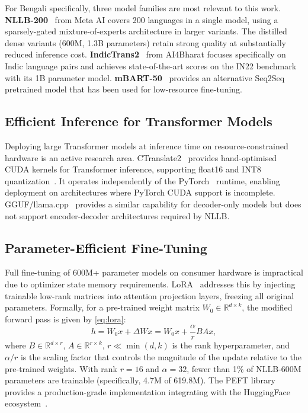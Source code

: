 \documentclass[conference]{IEEEtran}
\begin{document}
For Bengali specifically, three model families are most relevant to this work.
\textbf{NLLB-200}~\cite{nllb2022} from Meta AI covers 200 languages in a single model,
using a sparsely-gated mixture-of-experts architecture in larger variants.
The distilled dense variants (600M, 1.3B parameters) retain strong quality at
substantially reduced inference cost.
\textbf{IndicTrans2}~\cite{gala2023indictrans2} from AI4Bharat focuses specifically
on Indic language pairs and achieves state-of-the-art scores on the IN22 benchmark
with its 1B parameter model.
\textbf{mBART-50}~\cite{liu2020multilingual} provides an alternative Seq2Seq
pretrained model that has been used for low-resource fine-tuning.

\subsection{Efficient Inference for Transformer Models}

Deploying large Transformer models at inference time on resource-constrained hardware
is an active research area.
CTranslate2~\cite{ctranslate2_klein} provides hand-optimised CUDA kernels for
Transformer inference, supporting float16 and INT8 quantization~\cite{dettmers2022llmint8}.
It operates independently of the PyTorch~\cite{pytorch2024} runtime, enabling deployment
on architectures where PyTorch CUDA support is incomplete.
GGUF/llama.cpp~\cite{llamacpp} provides a similar capability for decoder-only models
but does not support encoder-decoder architectures required by NLLB.

\subsection{Parameter-Efficient Fine-Tuning}

Full fine-tuning of 600M+ parameter models on consumer hardware is impractical due to
optimizer state memory requirements.
LoRA~\cite{hu2021lora} addresses this by injecting trainable low-rank matrices
into attention projection layers, freezing all original parameters.
Formally, for a pre-trained weight matrix $W_0 \in \mathbb{R}^{d \times k}$,
the modified forward pass is given by \eqref{eq:lora}:
\begin{equation}
  h = W_0 x + \Delta W x = W_0 x + \frac{\alpha}{r} B A x,
  \label{eq:lora}
\end{equation}
where $B \in \mathbb{R}^{d \times r}$, $A \in \mathbb{R}^{r \times k}$,
$r \ll \min(d,k)$ is the rank hyperparameter, and $\alpha/r$ is the scaling factor
that controls the magnitude of the update relative to the pre-trained weights.
With rank $r=16$ and $\alpha=32$, fewer than 1\% of NLLB-600M parameters are trainable
(specifically, 4.7M of 619.8M).
The PEFT library~\cite{peft2022} provides a production-grade implementation
integrating with the HuggingFace ecosystem~\cite{wolf2020transformers}.
\end{document}
